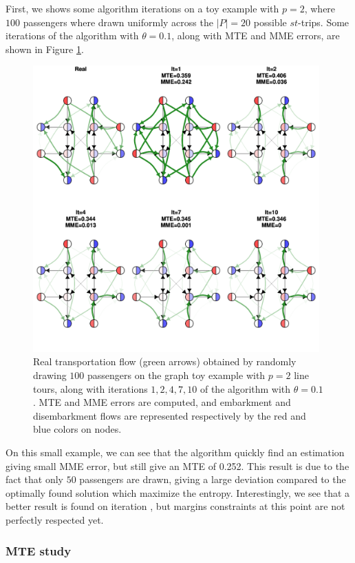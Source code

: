 \documentclass{bmcart}
\begin{document}
First, we shows some algorithm iterations on a toy example with $p=2$, where $100$ passengers where drawn uniformly across the $\vert P \vert = 20$ possible $st$-trips. Some iterations of the algorithm with $\theta=0.1$, along with MTE and MME errors, are shown in Figure \ref{iteration_plots}. 
\begin{figure}[h]
	\includegraphics[width=0.98\textwidth]{fig/iterations.pdf}
	\caption{Real transportation flow (green arrows) obtained by randomly drawing $100$ passengers on the graph toy example with $p=2$ line tours, along with iterations $1, 2, 4, 7, 10$ of the algorithm with $\theta=0.1$. MTE and MME errors are computed, and embarkment and disembarkment flows are represented respectively by the red and blue colors on nodes.}
	\label{iteration_plots}
\end{figure}
On this small example, we can see that the algorithm quickly find an estimation giving small MME error, but still give an MTE of 0.252. This result is due to the fact that only $50$ passengers are drawn, giving a large deviation compared to the optimally found solution which maximize the entropy. Interestingly, we see that a better result is found on iteration , but margins constraints at this point are not perfectly respected yet.

\subsubsection{MTE study}
\label{mte_study}
\end{document}

